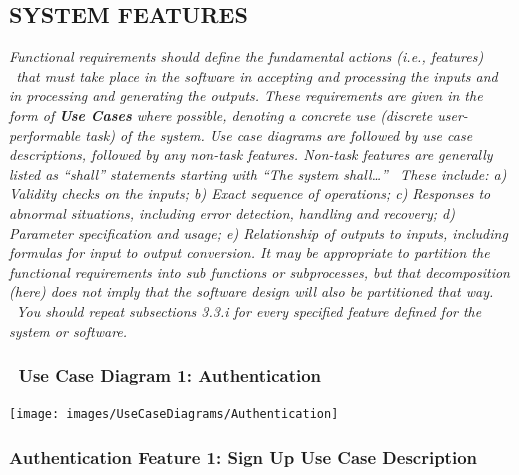 \documentclass[twoside,letterpaper]{article}
\begin{document}
\subsection[SYSTEM FEATURES]{\rmfamily\bfseries\color{black} SYSTEM FEATURES}
\hypertarget{RefHeading21659017292}{}{\itshape\color{black}
Functional requirements should define the fundamental actions (i.e., features) \ that must take place in the software in
accepting and processing the inputs and in processing and generating the outputs. These requirements are given in the
form of \textbf{Use Cases} where possible, denoting a concrete use (discrete user-performable task) of the system. Use
case diagrams are followed by use case descriptions, followed by any non-task features. Non-task features are generally
listed as ``shall'' statements starting with ``The system shall{\dots}'' \ These include: a) Validity checks on the
inputs; b) Exact sequence of operations; c) Responses to abnormal situations, including error detection, handling and
recovery; d) Parameter specification and usage; e) Relationship of outputs to inputs, including formulas for input to
output conversion. \newline
\newline
It may be appropriate to partition the functional requirements into sub functions or subprocesses, but that
decomposition (here) does not imply that the software design will also be partitioned that way. \ You should repeat
subsections 3.3.i for every specified feature defined for the system or software.}

\subsubsection[Use Case Diagram 1: Authentication]{\foreignlanguage{english}{\ Use Case Diagram 1: Authentication}}
\hypertarget{RefHeading21859017292}{}{\color{black}
}

\texttt{[image: images/UseCaseDiagrams/Authentication]}

\newpage

\subsubsection[Authentication Feature 1: Sign Up Use Case Description]{\rmfamily\bfseries\color{black}
Authentication Feature 1: Sign Up Use Case Description}
\hypertarget{RefHeading22059017292}{}
\end{document}
